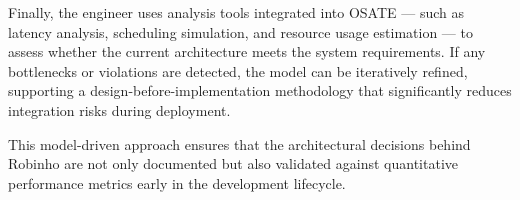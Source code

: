 \documentclass[
    12pt, 
    a4paper, 
    chapter=TITLE,		%
    section=TITLE,		%
    oneside,            %
    english
]{abntex2}
\begin{document}
Finally, the engineer uses analysis tools integrated into OSATE — such as latency analysis, scheduling simulation, and resource usage estimation — to assess whether the current architecture meets the system requirements. If any bottlenecks or violations are detected, the model can be iteratively refined, supporting a design-before-implementation methodology that significantly reduces integration risks during deployment.

This model-driven approach ensures that the architectural decisions behind Robinho are not only documented but also validated against quantitative performance metrics early in the development lifecycle.








\printbibliography
\end{document}
